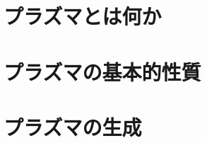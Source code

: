 \documentclass{report}
\begin{document}
  \maketitle
  \tableofcontents
  \chapter{プラズマとは何か}
    
  \chapter{プラズマの基本的性質}
    
  \chapter{プラズマの生成}
    
\end{document}
